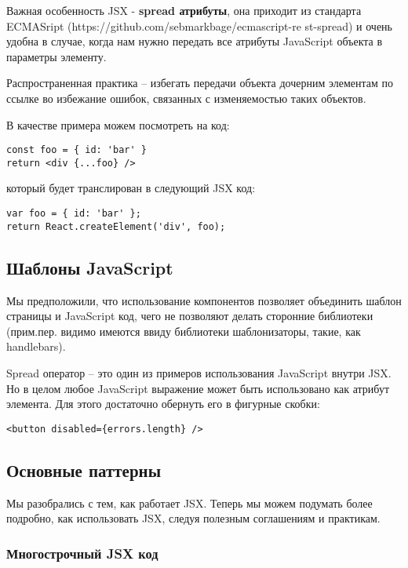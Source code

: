 Важная особенность JSX - \textbf{spread атрибуты}, она приходит из стандарта ECMASript (https://github.com/sebmarkbage/ecmascript-re st-spread) и очень удобна в случае, когда нам нужно передать все атрибуты JavaScript объекта в параметры элементу.

Распространенная практика -- избегать передачи объекта дочерним элементам по ссылке во избежание ошибок, связанных с изменяемостью таких объектов.

В качестве примера можем посмотреть на код:

\begin{lstlisting}
const foo = { id: 'bar' }
return <div {...foo} />
\end{lstlisting}
   
который будет транслирован в следующий JSX код:

\begin{lstlisting}
var foo = { id: 'bar' };
return React.createElement('div', foo);
\end{lstlisting}
   
\subsection{Шаблоны JavaScript}

Мы предположили, что использование компонентов позволяет объединить шаблон страницы и JavaScript код, чего не позволяют делать сторонние библиотеки (прим.пер. видимо имеются ввиду библиотеки шаблонизаторы, такие, как handlebars).

Spread оператор -- это один из примеров использования JavaScript внутри JSX. Но в целом любое JavaScript выражение может быть использовано как атрибут элемента. Для этого достаточно обернуть его в фигурные скобки:

\begin{lstlisting}
<button disabled={errors.length} />
\end{lstlisting}

\subsection{Основные паттерны}

Мы разобрались с тем, как работает JSX. Теперь мы можем подумать более подробно, как использовать JSX, следуя полезным соглашениям и практикам.

\subsubsection{Многострочный JSX код}

